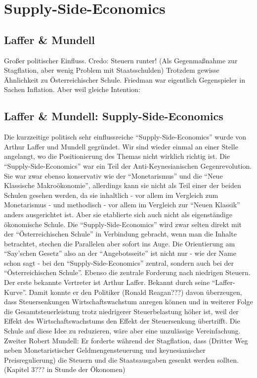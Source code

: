 %
%
%

\chapter{Supply-Side-Economics}
\label{Supply-Side-Economics}


\section{Laffer \& Mundell}
Großer politischer Einfluss. Credo: Steuern runter! (Als Gegenmaßnahme zur Stagflation, aber wenig Problem mit Staatsschulden)
Trotzdem gewisse Ähnlichkeit zu Österreichischer Schule.
Friedman war eigentlich Gegenspieler in Sachen Inflation. Aber weil gleiche Intention:



\section{Laffer \& Mundell: Supply-Side-Economics}

Die kurzzeitige politisch sehr einflussreiche "`Supply-Side-Economics"' wurde von Arthur Laffer und Mundell gegründet. Wir sind wieder einmal an einer Stelle angelangt, wo die Positionierung des Themas nicht wirklich richtig ist. Die "`Supply-Side-Economics"' war ein Teil der Anti-Keynesianischen Gegenrevolution. Sie war zwar ebenso konservativ wie der "`Monetarismus"' und die "`Neue Klassische Makroökonomie"', allerdings kann sie nicht als Teil einer der beiden Schulen gesehen werden, da sie inhaltlich - vor allem im Vergleich zum Monetarismus - und methodisch - vor allem im Vergleich zur "`Neuen Klassik"' anders ausgerichtet ist. Aber sie etablierte sich auch nicht als eigenständige ökonomische Schule.
Die "`Supply-Side-Economics"' wird zwar selten direkt mit der "`Österreichischen Schule"' in Verbindung gebracht, wenn man die Inhalte betrachtet, stechen die Parallelen aber sofort ins Auge. Die Orientierung am "`Say'schen Gesetz"' also an der "`Angebotsseite"' ist nicht nur - wie der Name schon sagt - bei den "`Supply-Side-Economics"' zentral, sondern auch bei der "`Österreichischen Schule"'. Ebenso die zentrale Forderung nach niedrigen Steuern.
Der erste bekannte Vertreter ist Arthur Laffer. Bekannt durch seine "`Laffer-Kurve"'. Damit konnte er den Politiker (Ronald Reagan???) davon überzeugen, dass Steuersenkungen Wirtschaftswachstum anregen können und in weiterer Folge die Gesamtsteuerleistung trotz niedrigerer Steuerbelastung höher ist, weil der Effekt des Wirtschaftswachstums den Effekt der Steuersenkung übertrifft. Die Schule auf diese Idee zu reduzieren, wäre aber eine unzulässige Vereinfachung.
Zweiter Robert Mundell: Er forderte während der Stagflation, dass (Dritter Weg neben Monetaristischer Geldmengensteuerung und keynesianischer Preisregulierung) die Steuern und die Staatsausgaben gesenkt werden sollten. (Kapitel 3??? in Stunde der Ökonomen)